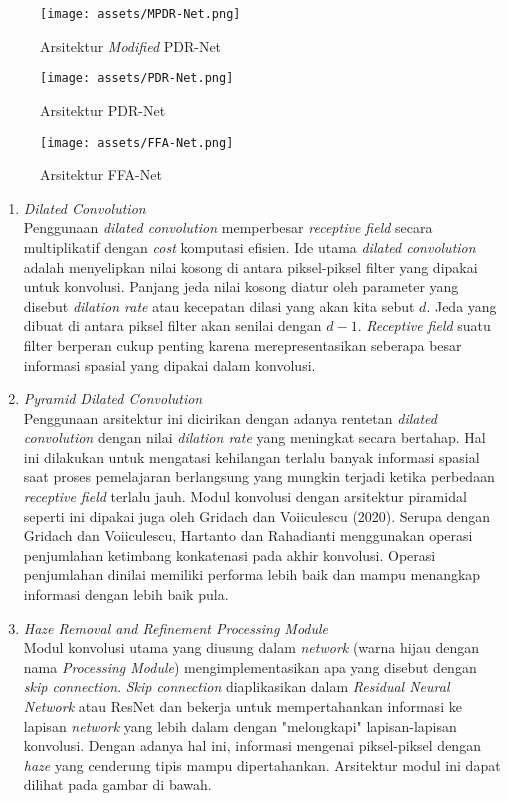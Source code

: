 \documentclass[11pt, a4paper, final]{report}
\begin{document}
\begin{figure}[htbp]
\centering
\texttt{[image: assets/MPDR-Net.png]}
\caption{Arsitektur \textit{Modified} PDR-Net}
\end{figure}

\begin{figure}[htbp]
\centering
\texttt{[image: assets/PDR-Net.png]}
\caption{Arsitektur PDR-Net}
\end{figure}

\begin{figure}[htbp]
\centering
\texttt{[image: assets/FFA-Net.png]}
\caption{Arsitektur FFA-Net}
\end{figure}

\newpage

\begin{enumerate}
    \item \textit{Dilated Convolution}\\
    Penggunaan \textit{dilated convolution} memperbesar \textit{receptive field} secara multiplikatif dengan \textit{cost} komputasi efisien. Ide utama \textit{dilated convolution} adalah menyelipkan nilai kosong di antara piksel-piksel filter yang dipakai untuk konvolusi. Panjang jeda nilai kosong diatur oleh parameter yang disebut \textit{dilation rate} atau kecepatan dilasi yang akan kita sebut $d$. Jeda yang dibuat di antara piksel filter akan senilai dengan $d - 1$. \textit{Receptive field} suatu filter berperan cukup penting karena merepresentasikan seberapa besar informasi spasial yang dipakai dalam konvolusi.
    
    \item \textit{Pyramid Dilated Convolution}\\
    Penggunaan arsitektur ini dicirikan dengan adanya rentetan \textit{dilated convolution} dengan nilai \textit{dilation rate} yang meningkat secara bertahap. Hal ini dilakukan untuk mengatasi kehilangan terlalu banyak informasi spasial saat proses pemelajaran berlangsung yang mungkin terjadi ketika perbedaan \textit{receptive field} terlalu jauh. Modul konvolusi dengan arsitektur piramidal seperti ini dipakai juga oleh Gridach dan Voiiculescu (2020). Serupa dengan Gridach dan Voiiculescu, Hartanto dan Rahadianti menggunakan operasi penjumlahan ketimbang konkatenasi pada akhir konvolusi. Operasi penjumlahan dinilai memiliki performa lebih baik dan mampu menangkap informasi dengan lebih baik pula.
    
    \item \textit{Haze Removal and Refinement Processing Module}\\
    Modul konvolusi utama yang diusung dalam \textit{network} (warna hijau dengan nama \textit{Processing Module}) mengimplementasikan apa yang disebut dengan \textit{skip connection}. \textit{Skip connection} diaplikasikan dalam \textit{Residual Neural Network} atau ResNet dan bekerja untuk mempertahankan informasi ke lapisan \textit{network} yang lebih dalam dengan "melongkapi" lapisan-lapisan konvolusi. Dengan adanya hal ini, informasi mengenai piksel-piksel dengan \textit{haze} yang cenderung tipis mampu dipertahankan. Arsitektur modul ini dapat dilihat pada gambar di bawah.
    

\end{enumerate}
\end{document}
